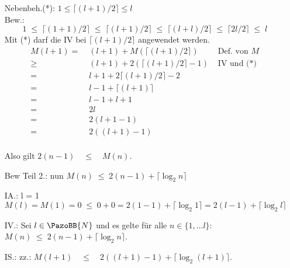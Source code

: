 \documentclass[12pt]{article}
\newcommand {\N}{\PazoBB{N}}   %
\begin{document}
\begin{enumerate}
Nebenbeh.(*): $1 \leq \lceil (l+1)/2 \rceil \leq l$ \\
Bew.:
\[
1 \;\leq\; \lceil (1+1) /2 \rceil\; \leq\;  \lceil (l+1)/2 \rceil \;\leq\;   \lceil (l+l)/2 \rceil \;\leq \; \lceil 2l/2 \rceil\; \leq\; l
\]
Mit (*) darf die IV bei $\lceil (l+1)/2 \rceil$ angewendet werden.
\begin{align*}
       M(l+1)       =     &\;   (l+1) + M(\lceil (l+1)/2 \rceil )         & \text{ Def. von } M \\
                        \geq &\;   (l+1) + 2 (\lceil (l+1)/2 \rceil -1)     &  \text{ IV und (*) } \\
                        =      &\;   l+1 + 2 \lceil (l+1) / 2 \rceil  - 2       &    \\
                        =      &\;   l - 1 + \lceil (l+1) \rceil                    &   \\
                        =      &\;   l -1 + l +1                                        &    \\
                        =      &\;  2 l                                                     &     \\
                        =      &\; 2 (l +1 -1)                                         &    \\
                        =      &\;  2 ((l+1) -1)                                       &     \\
  \end{align*}

Also gilt $2(n-1) \quad \leq \quad M(n)$.

\item[Bew Teil 2.:] nun   $M(n) \;  \leq \;   2 (n-1) + \lceil \log_2 n \rceil$
\item[IA.:] l = 1
\[
  M(l) = M(1) = 0 \; \leq \; 0 + 0 =2 (1-1) + \lceil \log_2 1 \rceil
                                                         = 2 (l-1) + \lceil \log_2 l \rceil
\]



\pagebreak
\item[IV.:] Sei $l\in \N$ und es gelte für alle $n\in \{ 1, \dots l \}$: 
   $M(n) \; \leq \; 2 (n-1) + \lceil \log_2 n \rceil$.
\item[IS.:] zz.: $M(l+1) \quad \leq \quad 2 ((l+1)-1) + \lceil \log_2 (l+1) \rceil$.\\


\end{enumerate}
\end{document}
